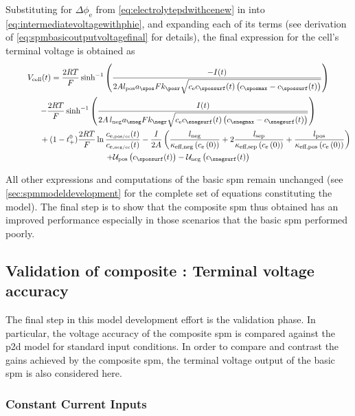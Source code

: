 Substituting for ${\Delta \phi_\text{e}}$ from \cref{eq:electrolytepdwithcenew} in
into \cref{eq:intermediatevoltagewithphie},  and  expanding  each of  its  terms
(see derivation of \cref{eq:spmbasicoutputvoltagefinal}  for details), the final
expression for the cell's terminal voltage is obtained as
\begin{multline}
    V_\text{cell}(t) = \frac{2 R T}{F }\sinh^{-1} \left( \frac{- I(t)}{2 A l_\text{pos} a_\spos F k_\posr \sqrt{c_\text{e} c_\spossurf(t) \left(c_\sposmax - c_\spossurf(t)\right)}}\right) \\
    - \frac{2 R T}{F }\sinh^{-1} \left( \frac{I(t)}{2 A \, l_\text{neg} a_\sneg F k_\negr \sqrt{c_\text{e} c_\snegsurf(t) \left(c_\snegmax - c_\snegsurf(t)\right)}}\right) \\
    \hphantom{\text{hello worl}}+ (1-t_{+}^0) \frac{2RT}{F}\ln \frac{c_\text{e,\tiny pos/cc}(t)}{c_\text{e,\tiny neg/cc}(t)} -\frac{I}{2 A}\left(\frac{l_\text{neg}}{\kappa_\text{eff,neg}\left(c_\text{e}\left(0\right)\right)} + 2 \frac{l_\text{sep}}{\kappa_\text{eff,sep}\left(c_\text{e}\left(0\right)\right)} +
\frac{l_\text{pos}}{\kappa_\text{eff,pos}\left(c_\text{e}\left(0\right)\right)}\right)\\
    + \mathcal{U}_\text{pos}\left(c_\spossurf(t)\right) - \mathcal{U}_\text{neg}\left(c_\snegsurf(t)\right)\label{eq:spmcompositeoutputvoltagefinal}
\end{multline}

All  other   expressions  and  computations   of  the  basic   \gls{spm}  remain
unchanged (see \cref{sec:spmmodeldevelopment} for the  complete set of equations
constituting the model). The final step  is to show that the composite \gls{spm}
thus obtained has an improved performance especially in those scenarios that the
basic \gls{spm} performed poorly.

\subsection{Validation of composite : Terminal voltage accuracy}

The final  step in  this model  development effort is  the validation  phase. In
particular, the voltage accuracy of  the composite \gls{spm} is compared against
the  \gls{p2d} model  for standard  input conditions.  In order  to compare  and
contrast the  gains achieved  by the composite  \gls{spm}, the  terminal voltage
output of the basic \gls{spm} is also considered here.

\subsubsection*{Constant Current Inputs}

